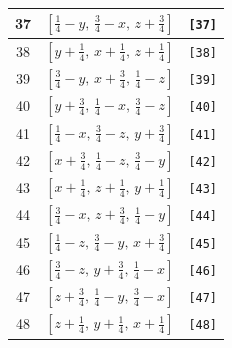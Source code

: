 \documentclass[fleqn,8pt]{jsarticle}
\begin{document}
\begin{longtable}{ccc}
37 & $\left[ \frac{1}{4} - y,\, \frac{3}{4} - x,\, z + \frac{3}{4} \right]$ & {\tt [37]} \\ \hline
38 & $\left[ y + \frac{1}{4},\, x + \frac{1}{4},\, z + \frac{1}{4} \right]$ & {\tt [38]} \\ \hline
39 & $\left[ \frac{3}{4} - y,\, x + \frac{3}{4},\, \frac{1}{4} - z \right]$ & {\tt [39]} \\ \hline
40 & $\left[ y + \frac{3}{4},\, \frac{1}{4} - x,\, \frac{3}{4} - z \right]$ & {\tt [40]} \\ \hline
41 & $\left[ \frac{1}{4} - x,\, \frac{3}{4} - z,\, y + \frac{3}{4} \right]$ & {\tt [41]} \\ \hline
42 & $\left[ x + \frac{3}{4},\, \frac{1}{4} - z,\, \frac{3}{4} - y \right]$ & {\tt [42]} \\ \hline
43 & $\left[ x + \frac{1}{4},\, z + \frac{1}{4},\, y + \frac{1}{4} \right]$ & {\tt [43]} \\ \hline
44 & $\left[ \frac{3}{4} - x,\, z + \frac{3}{4},\, \frac{1}{4} - y \right]$ & {\tt [44]} \\ \hline
45 & $\left[ \frac{1}{4} - z,\, \frac{3}{4} - y,\, x + \frac{3}{4} \right]$ & {\tt [45]} \\ \hline
46 & $\left[ \frac{3}{4} - z,\, y + \frac{3}{4},\, \frac{1}{4} - x \right]$ & {\tt [46]} \\ \hline
47 & $\left[ z + \frac{3}{4},\, \frac{1}{4} - y,\, \frac{3}{4} - x \right]$ & {\tt [47]} \\ \hline
48 & $\left[ z + \frac{1}{4},\, y + \frac{1}{4},\, x + \frac{1}{4} \right]$ & {\tt [48]} \\
\end{longtable}
\end{document}
